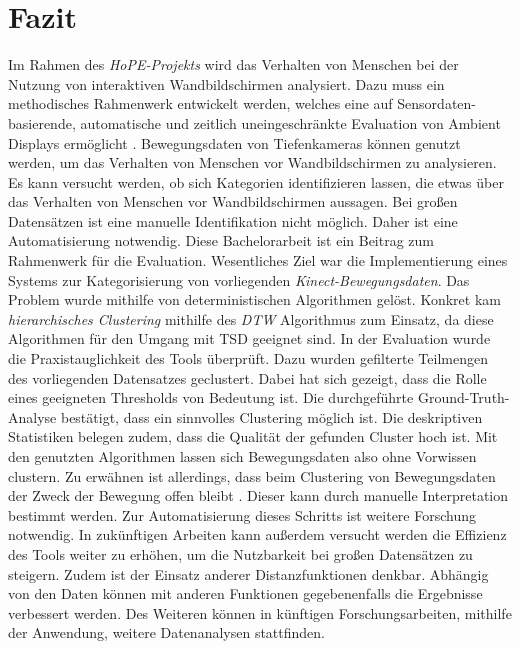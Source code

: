 \chapter{Fazit}
\label{chapter7}
Im Rahmen des \emph{HoPE-Projekts} wird das Verhalten von Menschen
bei der Nutzung von interaktiven Wandbildschirmen analysiert.
Dazu muss ein methodisches Rahmenwerk entwickelt werden, welches eine auf Sensordaten-basierende,
automatische und zeitlich uneingeschränkte Evaluation von Ambient Displays ermöglicht \citep{unibw_honeypot-effekt_2021}.
Bewegungsdaten von Tiefenkameras können genutzt werden,
um das Verhalten von Menschen vor Wandbildschirmen zu analysieren.
Es kann versucht werden, ob sich Kategorien identifizieren lassen,
die etwas über das Verhalten von Menschen vor Wandbildschirmen aussagen.
Bei großen Datensätzen ist eine manuelle Identifikation nicht möglich.
Daher ist eine Automatisierung notwendig.
Diese Bachelorarbeit ist ein Beitrag zum Rahmenwerk für die Evaluation.
Wesentliches Ziel war die Implementierung eines Systems zur Kategorisierung von vorliegenden \emph{Kinect-Bewegungsdaten}.
Das Problem wurde mithilfe von deterministischen Algorithmen gelöst.
Konkret kam \emph{hierarchisches Clustering} mithilfe des \emph{\ac{DTW}} Algorithmus zum Einsatz,
da diese Algorithmen für den Umgang mit \ac{TSD} geeignet sind.
In der Evaluation wurde die Praxistauglichkeit des Tools überprüft.
Dazu wurden gefilterte Teilmengen des vorliegenden Datensatzes geclustert.
Dabei hat sich gezeigt, dass die Rolle eines geeigneten Thresholds von Bedeutung ist.
Die durchgeführte Ground-Truth-Analyse bestätigt, dass ein sinnvolles Clustering möglich ist.
Die deskriptiven Statistiken belegen zudem, dass die Qualität der gefunden Cluster hoch ist.
Mit den genutzten Algorithmen lassen sich Bewegungsdaten also ohne Vorwissen clustern.
Zu erwähnen ist allerdings, dass beim Clustering von Bewegungsdaten
der Zweck der Bewegung offen bleibt \citep{monastero_traces_2018}.
Dieser kann durch manuelle Interpretation bestimmt werden.
Zur Automatisierung dieses Schritts ist weitere Forschung notwendig.
In zukünftigen Arbeiten kann außerdem versucht werden die Effizienz des Tools weiter zu erhöhen,
um die Nutzbarkeit bei großen Datensätzen zu steigern.
Zudem ist der Einsatz anderer Distanzfunktionen denkbar.
Abhängig von den Daten können mit anderen Funktionen gegebenenfalls die Ergebnisse verbessert werden.
Des Weiteren können in künftigen Forschungsarbeiten, mithilfe der Anwendung, weitere Datenanalysen stattfinden.